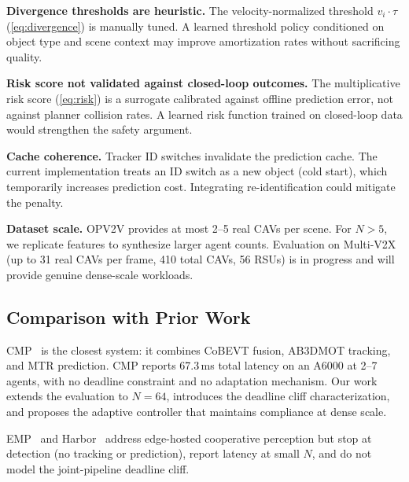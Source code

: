 \textbf{Divergence thresholds are heuristic.}  The velocity-normalized
threshold $v_i \cdot \tau$ (\cref{eq:divergence}) is manually tuned.
A learned threshold policy conditioned on object type and scene context
may improve amortization rates without sacrificing quality.

\textbf{Risk score not validated against closed-loop outcomes.}  The
multiplicative risk score (\cref{eq:risk}) is a surrogate calibrated
against offline prediction error, not against planner collision rates.
A learned risk function trained on closed-loop data would strengthen
the safety argument.

\textbf{Cache coherence.}  Tracker ID switches invalidate the
prediction cache.  The current implementation treats an ID switch as
a new object (cold start), which temporarily increases prediction
cost.  Integrating re-identification could mitigate the penalty.

\textbf{Dataset scale.}  OPV2V provides at most 2--5 real CAVs per
scene.  For $N > 5$, we replicate features to synthesize larger
agent counts.  Evaluation on Multi-V2X~\cite{multiv2x2024}
(up to 31 real CAVs per frame, 410 total CAVs, 56 RSUs) is in
progress and will provide genuine dense-scale workloads.

\subsection{Comparison with Prior Work}

CMP~\cite{cmp2024} is the closest system: it combines CoBEVT fusion,
AB3DMOT tracking, and MTR prediction.  CMP reports 67.3\,ms total
latency on an A6000 at 2--7 agents, with no deadline constraint and
no adaptation mechanism.  Our work extends the evaluation to $N{=}64$,
introduces the deadline cliff characterization, and proposes the
adaptive controller that maintains compliance at dense scale.

EMP~\cite{EMP} and Harbor~\cite{harbor} address edge-hosted
cooperative perception but stop at detection (no tracking or
prediction), report latency at small $N$, and do not model the
joint-pipeline deadline cliff.
